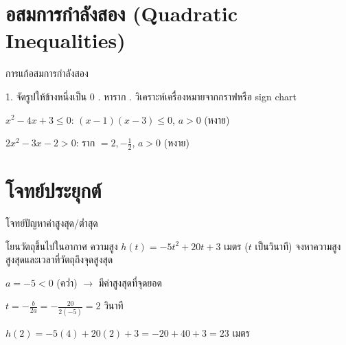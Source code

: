 \documentclass[11pt, aspectratio=169]{beamer}
\begin{document}
\section{อสมการกำลังสอง (Quadratic Inequalities)}

\begin{frame}{การแก้อสมการกำลังสอง}
  \begin{explanation}[วิธี]
    1. จัดรูปให้ข้างหนึ่งเป็น $0$ . หาราก . วิเคราะห์เครื่องหมายจากกราฟหรือ sign chart
  \end{explanation}

  \begin{exambox}[ตัวอย่าง]
    $x^2 - 4x + 3 \leq 0$: $(x-1)(x-3) \leq 0$, $a>0$ (หงาย)

    $2x^2 - 3x - 2 > 0$: ราก $= 2, -\frac{1}{2}$, $a>0$ (หงาย)
  \end{exambox}
\end{frame}

\section{โจทย์ประยุกต์}

\begin{frame}{โจทย์ปัญหาค่าสูงสุด/ตํ่าสุด}
  \begin{exambox}[โจทย์]
    โยนวัตถุขึ้นไปในอากาศ ความสูง $h(t) = -5t^2 + 20t + 3$ เมตร ($t$ เป็นวินาที)
    จงหาความสูงสูงสุดและเวลาที่วัตถุถึงจุดสูงสุด
  \end{exambox}

  \begin{solbox}[วิธีทำ]
    $a = -5 < 0$ (ควํ่า) $\rightarrow$ มีค่าสูงสุดที่จุดยอด

    $t = -\frac{b}{2a} = -\frac{20}{2(-5)} = 2$ วินาที

    $h(2) = -5(4) + 20(2) + 3 = -20 + 40 + 3 = 23$ เมตร

  \end{solbox}
\end{frame}
\end{document}
